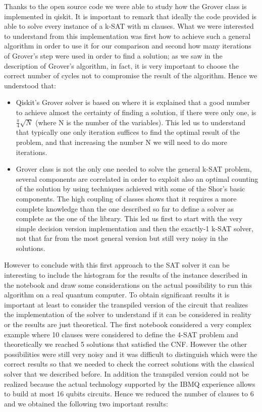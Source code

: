 \documentclass[english]{article}
\begin{document}
				Thanks to the open source code we were able to study how the Grover class is implemented in qiskit. It is important to remark that ideally the code provided is able to solve every instance of a k-SAT with m clauses. What we were interested to understand from this implementation was first how to achieve such a general algorithm in order to use it for our comparison and second how many iterations of Grover's step were used in order to find a solution; as we saw in the description of Grover's algorithm, in fact, it is very important to choose the correct number of cycles not to compromise the result of the algorithm. Hence we understood that:
				\begin{itemize}
					\item Qiskit's Grover solver is based on \cite[Boyer M., Brassard G., Hoyer P. and Tapp A.]{qiskitGrover} where it is explained that a good number to achieve almost the certainty of finding a solution, if there were only one, is $\frac{\pi}{4}\sqrt{N}$ (where N is the number of the variables). This led us to understand that typically one only iteration suffices to find the optimal result of the problem, and that increasing the number N we will need to do more iterations.
					
					\item Grover class is not the only one needed to solve the general k-SAT problem, several components are correlated in order to exploit also an optimal counting of the solution by using techniques achieved with some of the Shor's basic components. The high coupling of classes shows that it requires a more complete knowledge than the one described so far to define a solver as complete as the one of the library. This led us first to start with the very simple decision version implementation and then the exactly-1 k-SAT solver, not that far from the most general version but still very noisy in the solutions.
				\end{itemize}
				However to conclude with this first approach to the SAT solver it can be interesting to include the histogram for the results of the instance described in the notebook and draw some considerations on the actual possibility to run this algorithm on a real quantum computer. To obtain significant results it is important at least to consider the transpiled version of the circuit that realizes the implementation of the solver to understand if it can be considered in reality or the results are just theoretical. The first notebook considered a very complex example where 10 clauses were considered to define the 4-SAT problem and theoretically we reached 5 solutions that satisfied the CNF. However the other possibilities were still very noisy and it was difficult to distinguish which were the correct results so that we needed to check the correct solutions with the classical solver that we described before. In addition the transpiled version could not be realized because the actual technology supported by the IBMQ experience allows to build at most 16 qubits circuits. Hence we reduced the number of clauses to 6 and we obtained the following two important results:
\end{document}
